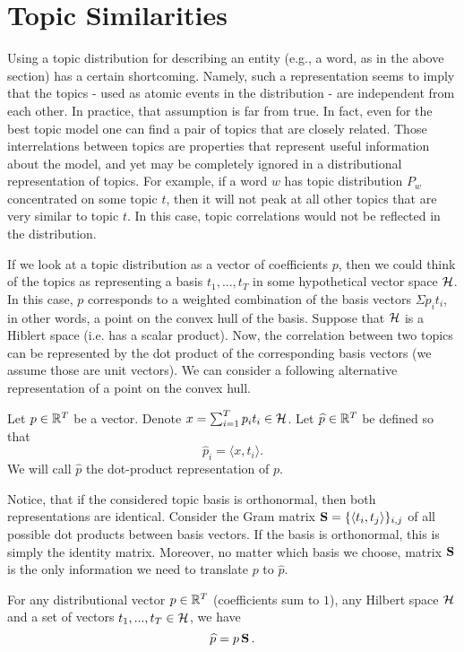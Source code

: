\documentclass{article} %
\begin{document}
\section{Topic Similarities}
\label{sec:topic-similarities}
Using a topic distribution for describing an entity (e.g., a word, as in
the above section) has a certain
shortcoming. Namely, such a representation seems to imply that the
topics - used as atomic events in the distribution - are independent
from each other. In practice, that assumption is far from true. In
fact, even for the best topic model one can find a pair of topics that
are closely related. Those interrelations between topics are
properties that represent useful information about the model, and yet
may be completely ignored in a distributional representation of
topics. For example, if a word $w$ has topic distribution $P_w$
concentrated on some topic $t$, then it will 
not peak at all other topics that are very similar to
topic $t$. In this case, topic correlations would not be reflected in
the distribution. 

If we look at a topic distribution as a vector of coefficients $p$, then
we could think of the topics as representing a basis $t_1,...,t_T$ in
some hypothetical vector space ${\mathcal H}$. In 
this case, $p$ corresponds to a weighted combination of the basis
vectors $\Sigma p_i t_i$, in other words, a point on the convex hull of the basis.
Suppose that ${\mathcal H}$ is a Hiblert space (i.e. has a scalar
product). Now, the correlation between two topics can be represented
by the dot product of the corresponding basis vectors (we assume those
are unit vectors). We can consider a following alternative representation
of a point on the convex hull.

\bed
Let $p\in{\mathbb R}^T$ be a vector. Denote $x=\sum_{i=1}^T p_i
t_i\in{\mathcal H}$. Let $\widehat{p}\in{\mathbb R}^T$ be defined so that
\[\widehat{p}_i = \langle x,t_i\rangle.\]
We will call $\widehat{p}$ the dot-product representation of $p$.
\eed

Notice, that if the considered topic basis is orthonormal, then both
representations are identical. Consider the Gram matrix
$\operatorname{\mathbf{S}}=\{\langle t_i,t_j\rangle\}_{i,j}$ of all possible dot products between
basis vectors. If the basis is orthonormal, this is simply the identity
matrix. Moreover, no matter which basis we choose, matrix $\operatorname{\mathbf{S}}$ is the
only information we need to translate $p$ to $\widehat{p}$.

\ber
For any distributional vector $p\in{\mathbb R}^T$ (coefficients
sum to $1$), any Hilbert space ${\mathcal H}$ and a set of
vectors $t_1,...,t_T\in{\mathcal H}$, we have 
\[\widehat{p} = p\operatorname{\mathbf{S}}.\]
\eer
\end{document}
